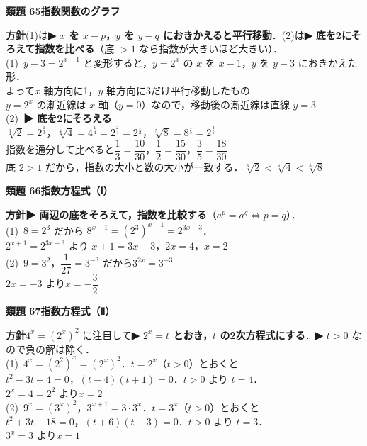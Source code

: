 \documentclass[a4paper,11pt]{ltjsarticle}
\newcommand{\ans}[2]{\Needspace{5\baselineskip}\vspace{6pt}%
  {\sffamily\bfseries 類題 #1\quad #2}\par}
\newcommand{\point}[1]{\textsf{\bfseries ▶ #1}}
\begin{document}
\ans{65}{指数関数のグラフ}
\begin{kai}
\textbf{方針}\quad (1)は\point{$x$ を $x-p$，$y$ を $y-q$ におきかえると平行移動}．(2)は\point{底を2にそろえて指数を比べる}（底 $>1$ なら指数が大きいほど大きい）．\\[2pt]
(1)\ $y-3=2^{x-1}$ と変形すると，$y=2^x$ の $x$ を $x-1$，$y$ を $y-3$ におきかえた形．\\
\hspace*{1.5em}よって\quad $x$ 軸方向に1，$y$ 軸方向に3だけ平行移動したもの\\
\hspace*{1.5em}$y=2^x$ の漸近線は $x$ 軸（$y=0$）なので，移動後の漸近線は\quad 直線 $y=3$\\[2pt]
(2)\ \point{底を2にそろえる}\\
\hspace*{1.5em}$\sqrt[3]2=2^{\frac13}$，\quad $\sqrt[4]4=4^{\frac14}=2^{\frac24}=2^{\frac12}$，\quad $\sqrt[5]8=8^{\frac15}=2^{\frac35}$\\
\hspace*{1.5em}指数を通分して比べると\quad $\dfrac13=\dfrac{10}{30}$，$\dfrac12=\dfrac{15}{30}$，$\dfrac35=\dfrac{18}{30}$\\
\hspace*{1.5em}底 $2>1$ だから，指数の大小と数の大小が一致する．\quad $\sqrt[3]2<\sqrt[4]4<\sqrt[5]8$
\end{kai}

\ans{66}{指数方程式（Ⅰ）}
\begin{kai}
\textbf{方針}\quad \point{両辺の底をそろえて，指数を比較する}（$a^p=a^q\iff p=q$）．\\[2pt]
(1)\ $8=2^3$ だから $8^{x-1}=(2^3)^{x-1}=2^{3x-3}$．\\
\hspace*{1.5em}$2^{x+1}=2^{3x-3}$ より $x+1=3x-3$，\quad $2x=4$，\quad $x=2$\\[2pt]
(2)\ $9=3^2$，$\dfrac1{27}=3^{-3}$ だから\quad $3^{2x}=3^{-3}$\\
\hspace*{1.5em}$2x=-3$ より\quad $x=-\dfrac32$
\end{kai}

\ans{67}{指数方程式（Ⅱ）}
\begin{kai}
\textbf{方針}\quad $4^x=(2^x)^2$ に注目して\point{$2^x=t$ とおき，$t$ の2次方程式にする}．\point{$t>0$} なので負の解は除く．\\[2pt]
(1)\ $4^x=(2^2)^x=(2^x)^2$．$t=2^x$（$t>0$）とおくと\\
\hspace*{1.5em}$t^2-3t-4=0$，\quad $(t-4)(t+1)=0$．$t>0$ より $t=4$．\\
\hspace*{1.5em}$2^x=4=2^2$ より\quad $x=2$\\[2pt]
(2)\ $9^x=(3^x)^2$，$3^{x+1}=3\cdot3^x$．$t=3^x$（$t>0$）とおくと\\
\hspace*{1.5em}$t^2+3t-18=0$，\quad $(t+6)(t-3)=0$．$t>0$ より $t=3$．\\
\hspace*{1.5em}$3^x=3$ より\quad $x=1$
\end{kai}
\end{document}

